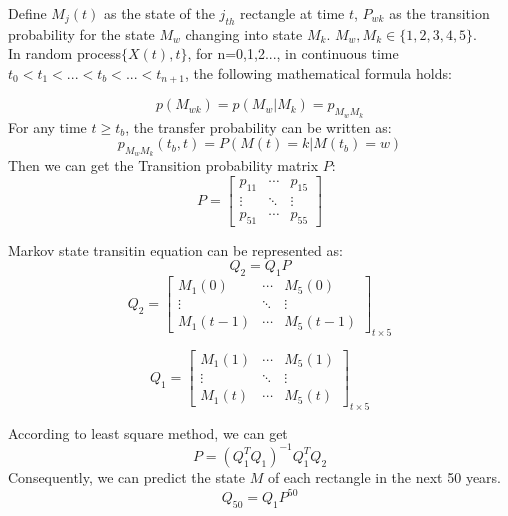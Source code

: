 \documentclass{mcmthesis}
\begin{document}
Define $M_{j}(t)$ as the state of the $j_{th}$ rectangle at time $t$, $P_{wk}$ as the transition probability for the state $M_w$ changing into state $M_k$.  $M_w,M_k \in \{1,2,3,4,5\}$.\\
In random process$\{X(t),t\}$, for n=0,1,2..., in continuous time$t_0<t_1<...<t_b<...<t_{n+1}$, the following mathematical formula holds:

\begin{equation}
p(M_{wk})=p(M_w|M_k)=p_{M_{w}M_{k}}
\end{equation}
For any time $t\geq t_b$, the transfer probability can be written as:
\begin{equation}
p_{M_{w}M_{k}}(t_b,t)=P(M(t)=k|M(t_b)=w)
\end{equation}
Then we can get the Transition probability matrix $P$:
\begin{equation}
P =
\begin{bmatrix}
p_{11}     & \cdots & p_{15}      \\
\vdots & \ddots & \vdots \\
p_{51}      & \cdots & p_{55}
\end{bmatrix}
\end{equation}

Markov state transitin equation can be represented as:
\begin{equation}Q_{2} = Q_{1} P \end{equation}
\begin{equation} Q_{2}=
\begin{bmatrix}
M_{1}(0)      & \cdots & M_{5}(0)      \\
\vdots & \ddots & \vdots \\
M_{1}(t-1)     & \cdots &M_{5}(t-1)
\end{bmatrix}_{t\times5}
\end{equation}

\begin{equation}Q_{1}=
\begin{bmatrix}
M_{1}(1)      & \cdots & M_{5}(1)      \\
\vdots & \ddots & \vdots \\
M_{1}(t)     & \cdots &M_{5}(t)
\end{bmatrix}_{t\times5}
\end{equation}

According to least square method, we can get
\begin{equation}
P = (Q_{1}^TQ_{1})^{-1}Q_{1}^T Q_{2}
\end{equation}
Consequently, we can predict the state $M$ of each rectangle in the next 50 years.
\begin{equation}
Q_{50}=Q_1P^{50}
\end{equation}
\end{document}
